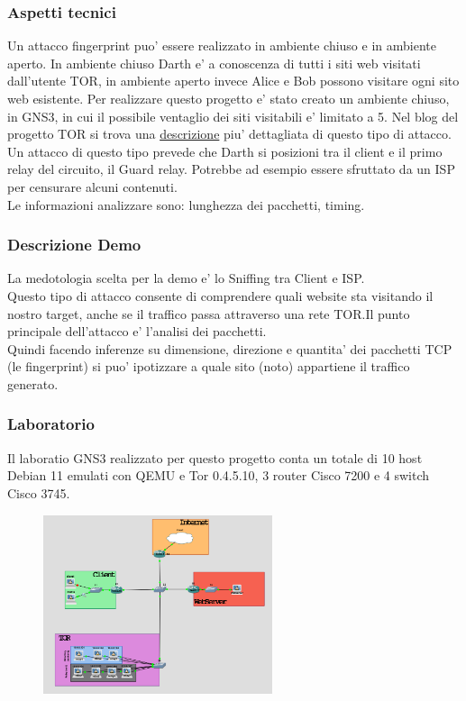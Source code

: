 \documentclass{beamer}[10pt]
\begin{document}
\begin{frame}
  \frametitle{Aspetti tecnici}
  Un attacco fingerprint puo' essere realizzato in ambiente chiuso e in ambiente aperto. In ambiente chiuso Darth e' a conoscenza di tutti i siti web visitati dall'utente TOR, in ambiente aperto invece Alice e Bob possono visitare ogni sito web esistente.
  Per realizzare questo progetto e' stato creato un ambiente chiuso, in GNS3, in cui il possibile ventaglio dei siti visitabili e' limitato a 5.
  Nel blog del progetto TOR si trova una \href{https://blog.torproject.org/critique-website-traffic-fingerprinting-attacks/}{descrizione}  piu' dettagliata di questo tipo di attacco.
  Un attacco di questo tipo prevede che Darth si posizioni tra il client e il primo relay del circuito, il Guard relay. Potrebbe ad esempio essere sfruttato da un ISP per censurare alcuni contenuti.
  \\ Le informazioni analizzare sono: lunghezza dei pacchetti, timing.
\end{frame}


\begin{frame}
  \frametitle{Descrizione Demo}
  La medotologia scelta per la demo e' lo Sniffing tra Client e ISP.\@
  \\ Questo tipo di attacco consente di comprendere quali website sta visitando il nostro target, anche se il traffico passa attraverso una rete TOR.\@ Il punto principale dell'attacco e' l'analisi dei pacchetti.\@
  \\ Quindi facendo inferenze su dimensione, direzione e quantita' dei pacchetti TCP (le fingerprint) si puo' ipotizzare a quale sito (noto) appartiene il traffico generato.
\end{frame}

\begin{frame}
  \frametitle{Laboratorio}
  Il laboratio GNS3 realizzato per questo progetto conta un totale di 10 host Debian 11 emulati con QEMU e Tor 0.4.5.10, 3 router Cisco 7200 e 4 switch Cisco 3745.
  \begin{figure}
    \centering
    \includegraphics[width=0.60\textwidth]{../img/topology.png}
  \end{figure}

\end{frame}
\end{document}
